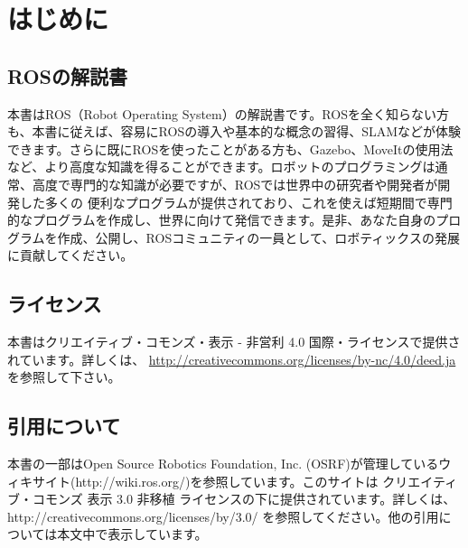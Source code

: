 \chapter*{はじめに}

\section*{ROSの解説書}

本書はROS（Robot Operating System）の解説書です。ROSを全く知らない方も、本書に従えば、容易にROSの導入や基本的な概念の習得、SLAMなどが体験できます。さらに既にROSを使ったことがある方も、Gazebo、MoveItの使用法など、より高度な知識を得ることができます。ロボットのプログラミングは通常、高度で専門的な知識が必要ですが、ROSでは世界中の研究者や開発者が開発した多くの
便利なプログラムが提供されており、これを使えば短期間で専門的なプログラムを作成し、世界に向けて発信できます。是非、あなた自身のプログラムを作成、公開し、ROSコミュニティの一員として、ロボティックスの発展に貢献してください。

\section*{ライセンス}

本書はクリエイティブ・コモンズ・表示 - 非営利 4.0 国際・ライセンスで提供されています。詳しくは、 \url{http://creativecommons.org/licenses/by-nc/4.0/deed.ja} を参照して下さい。

\section*{引用について}

本書の一部はOpen Source Robotics Foundation, Inc. (OSRF)が管理しているウィキサイト(http://wiki.ros.org/)を参照しています。このサイトは クリエイティブ・コモンズ 表示 3.0 非移植 ライセンスの下に提供されています。詳しくは、http://creativecommons.org/licenses/by/3.0/ を参照してください。他の引用については本文中で表示しています。

